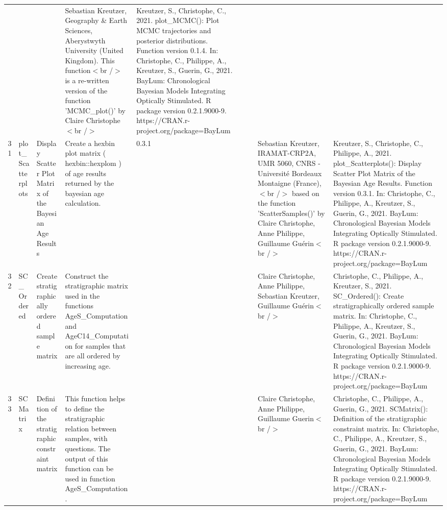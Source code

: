 \begin{table}[ht]
\begin{tabular}{rllllllll}
 &  &  & Sebastian Kreutzer, Geography \& Earth Sciences, Aberystwyth University (United Kingdom). This function$<$br /$>$ is a re-written version of the function 'MCMC\_plot()' by Claire Christophe$<$br /$>$ & Kreutzer, S., Christophe, C., 2021. plot\_MCMC(): Plot MCMC trajectories and posterior distributions. Function version 0.1.4. In: Christophe, C., Philippe, A., Kreutzer, S., Guerin, G., 2021. BayLum: Chronological Bayesian Models Integrating Optically Stimulated. R package version 0.2.1.9000-9. https://CRAN.r-project.org/package=BayLum
 \\ 
  31 & plot\_Scatterplots & Display Scatter Plot Matrix of the Bayesian Age Results & Create a hexbin plot matrix ( hexbin::hexplom ) of age results returned by the bayesian age calculation. & 0.3.1
 &  &  & Sebastian Kreutzer, IRAMAT-CRP2A, UMR 5060, CNRS - Université Bordeaux Montaigne (France),$<$br /$>$ based on the function 'ScatterSamples()' by Claire Christophe, Anne Philippe, Guillaume Guérin$<$br /$>$ & Kreutzer, S., Christophe, C., Philippe, A., 2021. plot\_Scatterplots(): Display Scatter Plot Matrix of the Bayesian Age Results. Function version 0.3.1. In: Christophe, C., Philippe, A., Kreutzer, S., Guerin, G., 2021. BayLum: Chronological Bayesian Models Integrating Optically Stimulated. R package version 0.2.1.9000-9. https://CRAN.r-project.org/package=BayLum
 \\ 
  32 & SC\_Ordered & Create stratigraphically ordered sample matrix & Construct the stratigraphic matrix used in the functions  AgeS\_Computation  and  AgeC14\_Computation  for samples that are all ordered by increasing age. &  &  &  & Claire Christophe, Anne Philippe, Sebastian Kreutzer, Guillaume Guérin$<$br /$>$ & Christophe, C., Philippe, A., Kreutzer, S., 2021. SC\_Ordered(): Create stratigraphically ordered sample matrix. In: Christophe, C., Philippe, A., Kreutzer, S., Guerin, G., 2021. BayLum: Chronological Bayesian Models Integrating Optically Stimulated. R package version 0.2.1.9000-9. https://CRAN.r-project.org/package=BayLum
 \\ 
  33 & SCMatrix & Definition of the stratigraphic constraint matrix & This function helps to define the stratigraphic relation between samples, with questions. The output of this function can be used in function  AgeS\_Computation . &  &  &  & Claire Christophe, Anne Philippe, Guillaume Guerin$<$br /$>$ & Christophe, C., Philippe, A., Guerin, G., 2021. SCMatrix(): Definition of the stratigraphic constraint matrix. In: Christophe, C., Philippe, A., Kreutzer, S., Guerin, G., 2021. BayLum: Chronological Bayesian Models Integrating Optically Stimulated. R package version 0.2.1.9000-9. https://CRAN.r-project.org/package=BayLum

\end{tabular}
\end{table}
